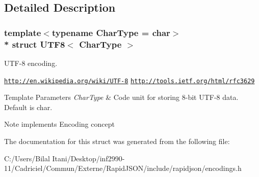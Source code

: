 \subsection{Detailed Description}
\subsubsection*{template$<$typename Char\+Type = char$>$\\*
struct U\+T\+F8$<$ Char\+Type $>$}

U\+T\+F-\/8 encoding. 

\href{http://en.wikipedia.org/wiki/UTF-8}{\tt http\+://en.\+wikipedia.\+org/wiki/\+U\+T\+F-\/8} \href{http://tools.ietf.org/html/rfc3629}{\tt http\+://tools.\+ietf.\+org/html/rfc3629} 
\begin{DoxyTemplParams}{Template Parameters}
{\em Char\+Type} & Code unit for storing 8-\/bit U\+T\+F-\/8 data. Default is char. \\
\hline
\end{DoxyTemplParams}
\begin{DoxyNote}{Note}
implements Encoding concept 
\end{DoxyNote}


The documentation for this struct was generated from the following file\+:\begin{DoxyCompactItemize}
\item 
C\+:/\+Users/\+Bilal Itani/\+Desktop/inf2990-\/11/\+Cadriciel/\+Commun/\+Externe/\+Rapid\+J\+S\+O\+N/include/rapidjson/encodings.\+h\end{DoxyCompactItemize}
